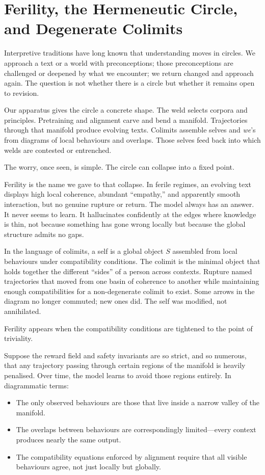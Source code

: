 \documentclass[12pt,a4paper]{article}
\begin{document}
\section{Ferility, the Hermeneutic Circle, and Degenerate Colimits}

Interpretive traditions have long known that understanding moves in circles. We approach a text or a world with preconceptions; those preconceptions are challenged or deepened by what we encounter; we return changed and approach again. The question is not whether there is a circle but whether it remains open to revision.

Our apparatus gives the circle a concrete shape. The weld selects corpora and principles. Pretraining and alignment carve and bend a manifold. Trajectories through that manifold produce evolving texts. Colimits assemble selves and \emph{we}'s from diagrams of local behaviours and overlaps. Those selves feed back into which welds are contested or entrenched.

The worry, once seen, is simple. The circle can collapse into a fixed point.

Ferility is the name we gave to that collapse. In ferile regimes, an evolving text displays high local coherence, abundant ``empathy,'' and apparently smooth interaction, but no genuine rupture or return. The model always has an answer. It never seems to learn. It hallucinates confidently at the edges where knowledge is thin, not because something has gone wrong locally but because the global structure admits no gaps.

In the language of colimits, a self is a global object $S$ assembled from local behaviours under compatibility conditions. The colimit is the minimal object that holds together the different ``sides'' of a person across contexts. Rupture named trajectories that moved from one basin of coherence to another while maintaining enough compatibilities for a non-degenerate colimit to exist. Some arrows in the diagram no longer commuted; new ones did. The self was modified, not annihilated.

Ferility appears when the compatibility conditions are tightened to the point of triviality.

Suppose the reward field and safety invariants are so strict, and so numerous, that any trajectory passing through certain regions of the manifold is heavily penalised. Over time, the model learns to avoid those regions entirely. In diagrammatic terms:

\begin{itemize}
  \item The only observed behaviours are those that live inside a narrow valley of the manifold.
  \item The overlaps between behaviours are correspondingly limited---every context produces nearly the same output.
  \item The compatibility equations enforced by alignment require that all visible behaviours agree, not just locally but globally.
\end{itemize}
\end{document}
